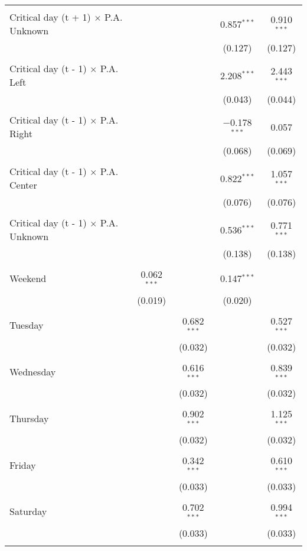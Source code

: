 \documentclass[
]{article}
\begin{document}
\begin{table}[!htbp]
{\begin{tabular}{@{\extracolsep{5pt}}lcccc}
  & & & & \\ 
 Critical day (t + 1) $\times$ P.A. Unknown &  &  & 0.857$^{***}$ & 0.910$^{***}$ \\ 
  &  &  & (0.127) & (0.127) \\ 
  & & & & \\ 
 Critical day (t - 1) $\times$ P.A. Left &  &  & 2.208$^{***}$ & 2.443$^{***}$ \\ 
  &  &  & (0.043) & (0.044) \\ 
  & & & & \\ 
 Critical day (t - 1) $\times$ P.A. Right &  &  & $-$0.178$^{***}$ & 0.057 \\ 
  &  &  & (0.068) & (0.069) \\ 
  & & & & \\ 
 Critical day (t - 1) $\times$ P.A. Center &  &  & 0.822$^{***}$ & 1.057$^{***}$ \\ 
  &  &  & (0.076) & (0.076) \\ 
  & & & & \\ 
 Critical day (t - 1) $\times$ P.A. Unknown &  &  & 0.536$^{***}$ & 0.771$^{***}$ \\ 
  &  &  & (0.138) & (0.138) \\ 
  & & & & \\ 
 Weekend & 0.062$^{***}$ &  & 0.147$^{***}$ &  \\ 
  & (0.019) &  & (0.020) &  \\ 
  & & & & \\ 
 Tuesday &  & 0.682$^{***}$ &  & 0.527$^{***}$ \\ 
  &  & (0.032) &  & (0.032) \\ 
  & & & & \\ 
 Wednesday &  & 0.616$^{***}$ &  & 0.839$^{***}$ \\ 
  &  & (0.032) &  & (0.032) \\ 
  & & & & \\ 
 Thursday &  & 0.902$^{***}$ &  & 1.125$^{***}$ \\ 
  &  & (0.032) &  & (0.032) \\ 
  & & & & \\ 
 Friday &  & 0.342$^{***}$ &  & 0.610$^{***}$ \\ 
  &  & (0.033) &  & (0.033) \\ 
  & & & & \\ 
 Saturday &  & 0.702$^{***}$ &  & 0.994$^{***}$ \\ 
  &  & (0.033) &  & (0.033) \\ 
  & & & & \\ 

\end{tabular}}
\end{table}
\end{document}
